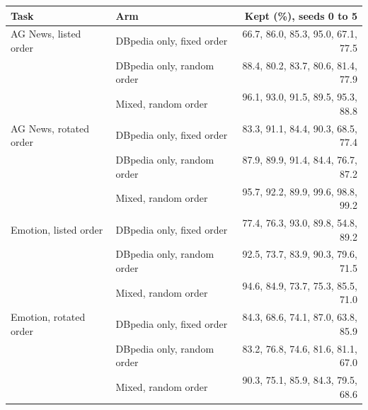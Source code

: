 \begin{tabular}{llr}
\toprule
Task & Arm & Kept (\%), seeds 0 to 5 \\
\midrule
AG News, listed order & DBpedia only, fixed order & 66.7, 86.0, 85.3, 95.0, 67.1, 77.5 \\
 & DBpedia only, random order & 88.4, 80.2, 83.7, 80.6, 81.4, 77.9 \\
 & Mixed, random order & 96.1, 93.0, 91.5, 89.5, 95.3, 88.8 \\
\addlinespace[2pt]
AG News, rotated order & DBpedia only, fixed order & 83.3, 91.1, 84.4, 90.3, 68.5, 77.4 \\
 & DBpedia only, random order & 87.9, 89.9, 91.4, 84.4, 76.7, 87.2 \\
 & Mixed, random order & 95.7, 92.2, 89.9, 99.6, 98.8, 99.2 \\
\addlinespace[2pt]
Emotion, listed order & DBpedia only, fixed order & 77.4, 76.3, 93.0, 89.8, 54.8, 89.2 \\
 & DBpedia only, random order & 92.5, 73.7, 83.9, 90.3, 79.6, 71.5 \\
 & Mixed, random order & 94.6, 84.9, 73.7, 75.3, 85.5, 71.0 \\
\addlinespace[2pt]
Emotion, rotated order & DBpedia only, fixed order & 84.3, 68.6, 74.1, 87.0, 63.8, 85.9 \\
 & DBpedia only, random order & 83.2, 76.8, 74.6, 81.6, 81.1, 67.0 \\
 & Mixed, random order & 90.3, 75.1, 85.9, 84.3, 79.5, 68.6 \\
\bottomrule
\end{tabular}
